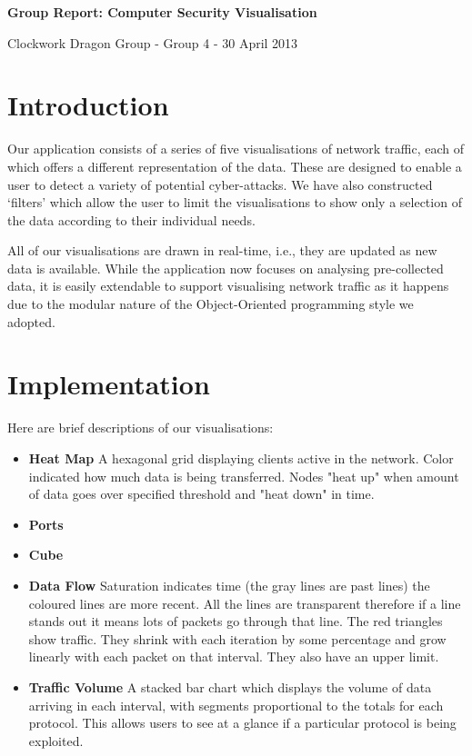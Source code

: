 \documentclass[12pt,a4paper]{article}
\begin{document}
	
	\begin{center}
		\textbf{Group Report: Computer Security Visualisation}
		
		Clockwork Dragon Group - Group 4 - 30 April 2013
	\end{center}
	\bigskip

    \section*{Introduction}
	Our application consists of a series of five visualisations of network traffic, each of which offers a different representation of the data. These are designed to enable a user to detect a variety of potential cyber-attacks. 
			We have also constructed `filters' which allow the user to limit the visualisations to show only a selection of the data according to their individual needs. 
			
			All of our visualisations are drawn in real-time, i.e., they are updated as new data is available. While the application now focuses on analysing pre-collected data, it is easily extendable to support visualising network traffic as it happens due to the modular nature of the Object-Oriented programming style we adopted.

    \section*{Implementation}
			Here are brief descriptions of our visualisations:
			
			\begin{itemize}
            
            \item \textbf{Heat Map} A hexagonal grid displaying clients active in the network. Color indicated how much data is being transferred. Nodes "heat up" when amount of data goes over specified threshold and "heat down" in time.

            \item \textbf{Ports}

            \item \textbf{Cube}

            \item \textbf{Data Flow} Saturation indicates time (the gray lines are past lines) the coloured lines are more recent. All the lines are transparent therefore if a line stands out it means lots of packets go through that line. The red triangles show traffic. They shrink with each iteration by some percentage and grow linearly with each packet on that interval. They also have an upper limit.

            \item \textbf{Traffic Volume} A stacked bar chart which displays the volume of data arriving in each interval, with segments proportional to the totals for each protocol. This allows users to see at a glance if a particular protocol is being exploited.
            
            \end{itemize}
			
\end{document}
